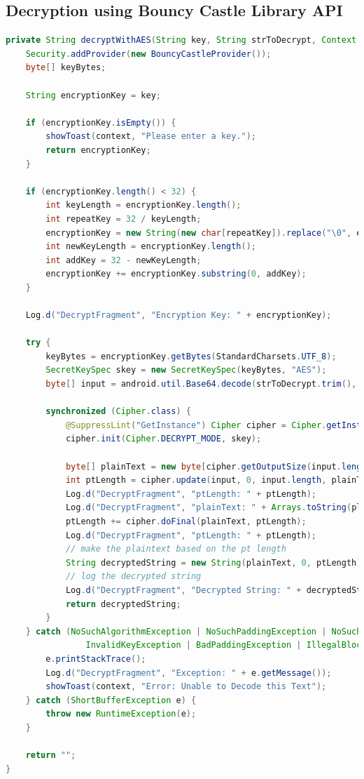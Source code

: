 \documentclass[11pt]{article}
\begin{document}
\subsection{Decryption using Bouncy Castle Library API}

\begin{lstlisting}[language=java]
private String decryptWithAES(String key, String strToDecrypt, Context context) {
    Security.addProvider(new BouncyCastleProvider());
    byte[] keyBytes;

    String encryptionKey = key;

    if (encryptionKey.isEmpty()) {
        showToast(context, "Please enter a key.");
        return encryptionKey;
    }

    if (encryptionKey.length() < 32) {
        int keyLength = encryptionKey.length();
        int repeatKey = 32 / keyLength;
        encryptionKey = new String(new char[repeatKey]).replace("\0", encryptionKey);
        int newKeyLength = encryptionKey.length();
        int addKey = 32 - newKeyLength;
        encryptionKey += encryptionKey.substring(0, addKey);
    }

    Log.d("DecryptFragment", "Encryption Key: " + encryptionKey);

    try {
        keyBytes = encryptionKey.getBytes(StandardCharsets.UTF_8);
        SecretKeySpec skey = new SecretKeySpec(keyBytes, "AES");
        byte[] input = android.util.Base64.decode(strToDecrypt.trim(), android.util.Base64.DEFAULT);

        synchronized (Cipher.class) {
            @SuppressLint("GetInstance") Cipher cipher = Cipher.getInstance("AES/ECB/PKCS7Padding", "BC");
            cipher.init(Cipher.DECRYPT_MODE, skey);

            byte[] plainText = new byte[cipher.getOutputSize(input.length)];
            int ptLength = cipher.update(input, 0, input.length, plainText, 0);
            Log.d("DecryptFragment", "ptLength: " + ptLength);
            Log.d("DecryptFragment", "plainText: " + Arrays.toString(plainText));
            ptLength += cipher.doFinal(plainText, ptLength);
            Log.d("DecryptFragment", "ptLength: " + ptLength);
            // make the plaintext based on the pt length
            String decryptedString = new String(plainText, 0, ptLength);
            // log the decrypted string
            Log.d("DecryptFragment", "Decrypted String: " + decryptedString);
            return decryptedString;
        }
    } catch (NoSuchAlgorithmException | NoSuchPaddingException | NoSuchProviderException |
                InvalidKeyException | BadPaddingException | IllegalBlockSizeException e) {
        e.printStackTrace();
        Log.d("DecryptFragment", "Exception: " + e.getMessage());
        showToast(context, "Error: Unable to Decode this Text");
    } catch (ShortBufferException e) {
        throw new RuntimeException(e);
    }

    return "";
}
\end{lstlisting}
\end{document}
